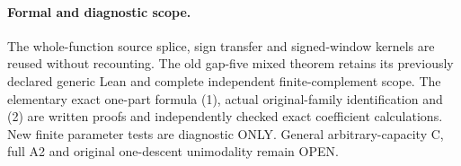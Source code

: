 \paragraph{Formal and diagnostic scope.}
The whole-function source splice, sign transfer and signed-window
kernels are reused without recounting. The old gap-five mixed theorem
retains its previously declared generic Lean and complete independent
finite-complement scope. The elementary exact one-part formula (1),
actual original-family identification and (2) are written proofs and
independently checked exact coefficient calculations. New finite
parameter tests are diagnostic ONLY. General arbitrary-capacity C,
full A2 and original one-descent unimodality remain OPEN.
